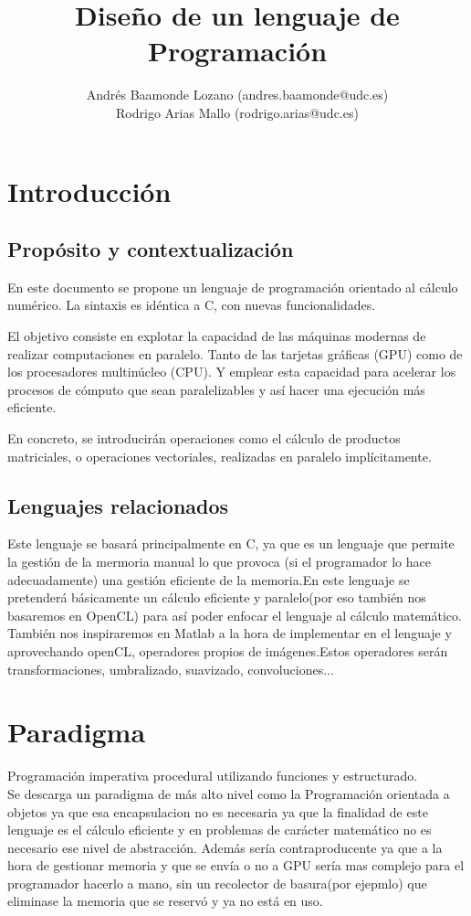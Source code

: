 \documentclass[12pt,a4paper]{article}
\title{Diseño de un lenguaje de Programación}
\author{Andrés Baamonde Lozano (andres.baamonde@udc.es)\\
	Rodrigo Arias Mallo (rodrigo.arias@udc.es)}
\begin{document}
\maketitle

\clearpage 

\tableofcontents

\clearpage 

\section{Introducción}
\subsection{Propósito y contextualización}
En este documento se propone un lenguaje de programación orientado al cálculo 
numérico. La sintaxis es idéntica a C, con nuevas funcionalidades.

El objetivo consiste en explotar la capacidad de las máquinas modernas de 
realizar computaciones en paralelo. Tanto de las tarjetas gráficas (GPU) como de 
los procesadores multinúcleo (CPU). Y emplear esta capacidad para acelerar los 
procesos de cómputo que sean paralelizables y así hacer una ejecución más eficiente.

En concreto, se introducirán operaciones como el cálculo de productos 
matriciales, o operaciones vectoriales, realizadas en paralelo implícitamente.
\subsection{Lenguajes relacionados}
Este lenguaje se basará principalmente en C, ya que es un lenguaje que permite la gestión de la mermoria manual lo que provoca (si el programador lo hace adecuadamente) una gestión eficiente de la memoria.En este lenguaje se pretenderá básicamente un cálculo eficiente y paralelo(por eso también nos basaremos en OpenCL) para así poder enfocar el lenguaje al cálculo matemático.\\
También nos inspiraremos en Matlab a la hora de implementar en el lenguaje y aprovechando openCL, operadores propios de imágenes.Estos operadores serán transformaciones, umbralizado, suavizado, convoluciones...
\section{Paradigma}
Programación imperativa procedural utilizando funciones y estructurado.\\
Se descarga un paradigma de más alto nivel como la Programación orientada a objetos ya que esa encapsulacion no es necesaria ya que la finalidad de este lenguaje es el cálculo eficiente y en problemas de carácter matemático no es necesario ese nivel de abstracción. Además sería contraproducente ya que a la hora de gestionar memoria y que se envía o no a GPU sería mas complejo para el programador hacerlo a mano, sin un recolector de basura(por ejepmlo) que eliminase la memoria que se reservó y ya no está en uso.
\end{document}
